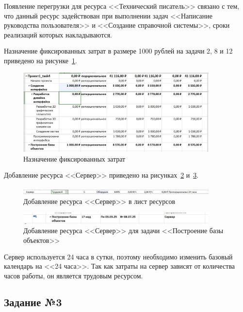 Появление перегрузки для ресурса <<Технический писатель>> связано с тем, что данный ресурс задействован при выполнении задач <<Написание руководства пользователя>> и <<Создание справочной системы>>, сроки реализаций которых накладываются.

Назначение фиксированных затрат в размере 1000 рублей на задачи 2, 8 и 12 приведено на рисунке~\ref{fig:cost}.

\begin{figure}[H]
	\centering
	\includegraphics[width=0.9\textwidth]{img/lab2/task2/cost.jpg}
	\caption{Назначение фиксированных затрат}
	\label{fig:cost}
\end{figure}

Добавление ресурса <<Сервер>> приведено на рисунках~\ref{fig:server} и~\ref{fig:gant_server}.

\begin{figure}[H]
	\centering
	\includegraphics[width=0.9\textwidth]{img/lab2/task2/server.jpg}
	\caption{Добавление ресурса <<Сервер>> в лист ресурсов}
	\label{fig:server}
\end{figure}

\begin{figure}[H]
	\centering
	\includegraphics[width=0.9\textwidth]{img/lab2/task2/gant_server.jpg}
	\caption{Добавление ресурса <<Сервер>> для задачи <<Построение базы объектов>>}
	\label{fig:gant_server}
\end{figure}

Сервер используется 24 часа в сутки, поэтому необходимо изменить базовый календарь на <<24 часа>>.
Так как затраты на сервер зависят от количества часов работы, он является трудовым ресурсом.

\subsection{Задание №3}

